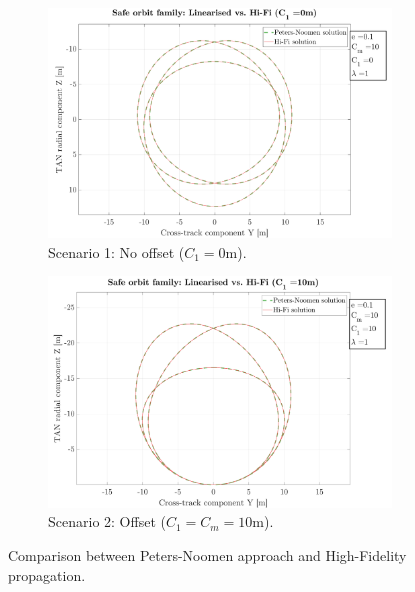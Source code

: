 		\begin{figure}[!ht]
		\centering
		\medskip
		\begin{subfigure}[t]{0.9\linewidth}
		\centering\includegraphics[width=\linewidth]{Chapters/Chapter_03/Low_quality/Safe_orbit_comp_C1_0}
		\caption{Scenario 1: No offset ($C_1 = 0$m).}
		\label{figCh3:PN_vs_HiFi_1}
		\end{subfigure}
		\begin{subfigure}[t]{\linewidth}
		\centering\includegraphics[width=0.9\linewidth]{Chapters/Chapter_03/High_quality/Safe_orbit_comp_C1_10}
		\caption{Scenario 2: Offset ($C_1 = C_m = 10$m).}
		\label{figCh3:PN_vs_HiFi_2}
		\end{subfigure}
		\caption{Comparison between Peters-Noomen approach and High-Fidelity propagation.}
		\label{figCh3:PN_vs_HiFi}
		\end{figure}
		\FloatBarrier
		
